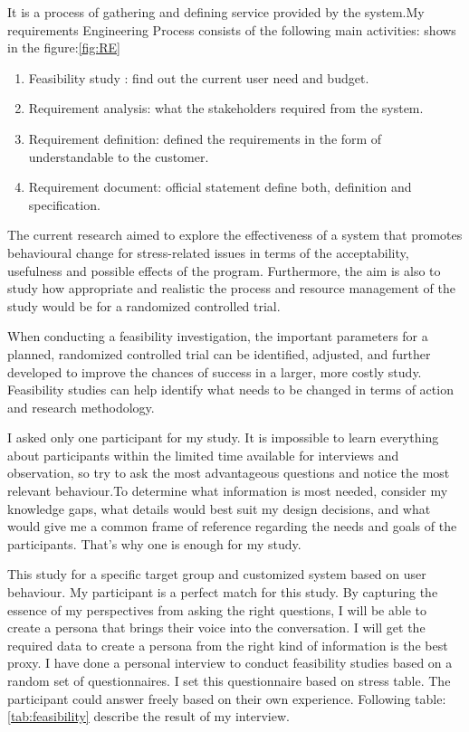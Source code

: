 It is a process of gathering and defining service provided by the system.My requirements Engineering Process consists of the following main activities: shows in the figure:\ref{fig:RE}

\begin{enumerate}
    \item  Feasibility study : find out the current user need and budget.
    \item Requirement analysis: what the stakeholders required from the system.
    \item Requirement definition: defined the requirements in the form of understandable to the customer.
    \item Requirement document: official statement define both, definition and specification.
\end{enumerate}

The current research aimed to explore the effectiveness of a system that promotes behavioural change for stress-related issues in terms of the acceptability, usefulness and possible effects of the program. Furthermore, the aim is also to study how appropriate and realistic the process and resource management of the study would be for a randomized controlled trial. \citep{Eklund2018EvaluationStudy}

When conducting a feasibility investigation, the important parameters for a planned, randomized controlled trial can be identified, adjusted, and further developed to improve the chances of success in a larger, more costly study. Feasibility studies can help identify what needs to be changed in terms of action and research methodology. 

I asked only one participant for my study. It is impossible to learn everything about participants within the limited time available for interviews and observation, so try to ask the most advantageous questions and notice the most relevant behaviour.To determine what information is most needed, consider my knowledge gaps, what details would best suit my design decisions, and what would give me a common frame of reference regarding the needs and goals of the participants. That's why one is enough for my study.
 
 This study for a specific target group and customized system based on user behaviour. My participant is a perfect match for this study. By capturing the essence of my perspectives from asking the right questions, I will be able to create a persona that brings their voice into the conversation. I will get the required data to create a persona from the right kind of information is the best proxy. I have done a personal interview to conduct feasibility studies based on a random set of questionnaires. I set this questionnaire based on \cite{Michie2002CausesWork.} stress table. The participant could answer freely based on their own experience. Following table:\ref{tab:feasibility} describe the result of my interview. 

